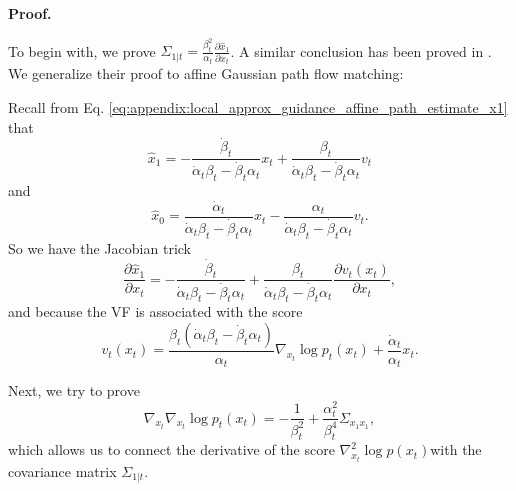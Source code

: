 \textbf{Proof.}


To begin with, we prove $\Sigma_{1|t}=\frac{\beta_t^2}{\alpha_t} \frac{\partial \hat{x}_1}{\partial x_t}$. A similar conclusion has been proved in \citet{ye_tfg_2024}. We generalize their proof to affine Gaussian path flow matching:

Recall from Eq. \eqref{eq:appendix:local_approx_guidance_affine_path_estimate_x1} that
\begin{equation}
    \hat{x}_1 = -\frac{\dot\beta_t}{\dot \alpha_t \beta_t - \dot \beta_t \alpha_t} x_t + \frac{\beta_t}{\dot \alpha_t \beta_t - \dot \beta_t \alpha_t} v_t
\end{equation}
and \begin{equation}
    \hat{x}_0 = \frac{\dot\alpha_t}{\dot \alpha_t \beta_t - \dot \beta_t \alpha_t} x_t - \frac{\alpha_t}{\dot \alpha_t \beta_t - \dot \beta_t \alpha_t} v_t.
\end{equation}
So we have the Jacobian trick
\begin{equation}
    \frac{\partial \hat{x}_1}{\partial x_t} = -\frac{\dot\beta_t}{\dot \alpha_t \beta_t - \dot \beta_t \alpha_t} + \frac{\beta_t}{\dot \alpha_t \beta_t - \dot \beta_t \alpha_t} \frac{\partial v_t(x_t)}{\partial x_t},
\end{equation}
and because the VF is associated with the score
\begin{equation}\label{eq:appendix:score_and_vector_field}
    v_t(x_t) = \frac{\beta_t(\dot\alpha_t\beta_t - \dot \beta_t\alpha_t)}{\alpha_t} \nabla_{x_t}\log p_t(x_t) + \frac{\dot\alpha_t}{\alpha_t}x_t.
\end{equation}

Next, we try to prove 
\begin{equation}\label{eq:appendix:score_derivative_and_covariance}
    \nabla_{x_t}\nabla_{x_t}\log p_t(x_t) = -\frac{1}{\beta_t^2} + \frac{\alpha_t^2}{\beta_t^4} \Sigma_{x_1x_1},
\end{equation}
which allows us to connect the derivative of the score $\nabla^2_{x_t}\log p(x_t)$\footnotemark with the covariance matrix $\Sigma_{1|t}$.

